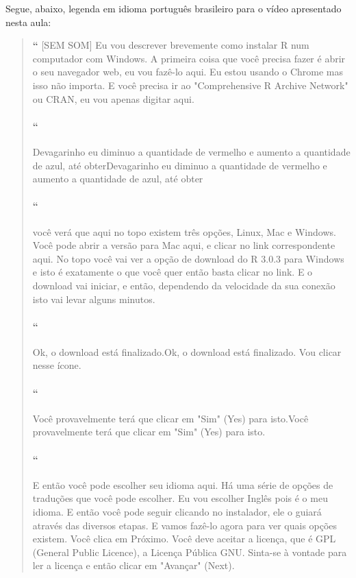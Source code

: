 Segue, abaixo, legenda em idioma português brasileiro para o vídeo apresentado nesta aula:

\begin{quotation}%
\begin{small}
{\large\textbf{``}}%
[SEM SOM] Eu vou descrever brevemente como instalar R num computador com Windows. A primeira coisa que você precisa fazer é abrir o seu navegador web, eu vou fazê-lo aqui. Eu estou usando o Chrome mas isso não importa. E você precisa ir ao "Comprehensive R Archive Network" ou CRAN, eu vou apenas digitar aqui. 

\paragraph{``}
Devagarinho eu diminuo a quantidade de vermelho e aumento a quantidade de azul, até obterDevagarinho eu diminuo a quantidade de vermelho e aumento a quantidade de azul, até obter 

\paragraph{``}
você verá que aqui no topo existem três opções, Linux, Mac e Windows. Você pode abrir a versão para Mac aqui, e clicar no link correspondente aqui. No topo você vai ver a opção de download do R 3.0.3 para Windows e isto é exatamente o que você quer então basta clicar no link. E o download vai iniciar, e então, dependendo da  velocidade da sua conexão isto vai levar alguns minutos. 

\paragraph{``}
Ok, o download está finalizado.Ok, o download está finalizado. Vou clicar nesse ícone. 

\paragraph{``}
Você provavelmente terá que clicar em "Sim" (Yes) para isto.Você provavelmente terá que clicar em "Sim" (Yes) para isto. 

\paragraph{``}
E então você pode escolher seu idioma aqui. Há uma série de opções de traduções que você pode escolher. Eu vou escolher Inglês pois é o meu idioma. E então você pode seguir clicando no instalador, ele o guiará através das diversos etapas. E vamos fazê-lo agora para ver quais opções existem. Você clica em Próximo. Você deve aceitar a licença, que é GPL (General Public Licence), a Licença Pública GNU. Sinta-se à vontade para ler a licença e então clicar em "Avançar" (Next). 


\end{small}
\end{quotation}
